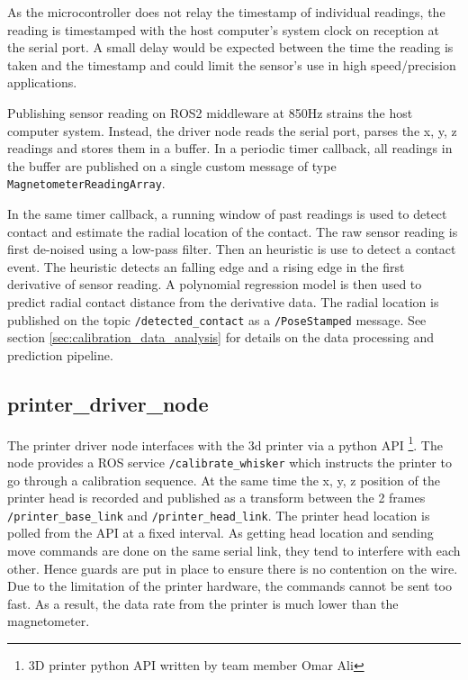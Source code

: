 \documentclass[runningheads]{llncs}
\begin{document}
As the microcontroller does not relay the timestamp of individual readings, the reading is timestamped with the host computer's system clock on reception at the serial port. A small delay would be expected between the time the reading is taken and the timestamp and could limit the sensor's use in high speed/precision applications.

Publishing sensor reading on ROS2 middleware at 850Hz strains the host computer system. Instead, the driver node reads the serial port, parses the x, y, z readings and stores them in a buffer. In a periodic timer callback, all readings in the buffer are published on a single custom message of type \verb|MagnetometerReadingArray|.

In the same timer callback, a running window of past readings is used to detect contact and estimate the radial location of the contact. The raw sensor reading is first de-noised using a low-pass filter. Then an heuristic is use to detect a contact event. The heuristic detects an falling edge and a rising edge in the first derivative of sensor reading. A polynomial regression model is then used to predict radial contact distance from the derivative data.
The radial location is published on the topic \verb|/detected_contact| as a \verb|/PoseStamped| message. See section \ref{sec:calibration_data_analysis} for details on the data processing and prediction pipeline.

\subsection{printer\_driver\_node}

The printer driver node interfaces with the 3d printer via a python API \footnote{3D printer python API written by team member Omar Ali}. The node provides a ROS service \verb|/calibrate_whisker| which instructs the printer to go through a calibration sequence. At the same time the x, y, z position of the printer head is recorded and published as a transform between the 2 frames \verb|/printer_base_link| and \verb|/printer_head_link|. The printer head location is polled from the API at a fixed interval. As getting head location and sending move commands are done on the same serial link, they tend to interfere with each other. Hence guards are put in place to ensure there is no contention on the wire. Due to the limitation of the printer hardware, the commands cannot be sent too fast. As a result, the data rate from the printer is much lower than the magnetometer.
\end{document}
